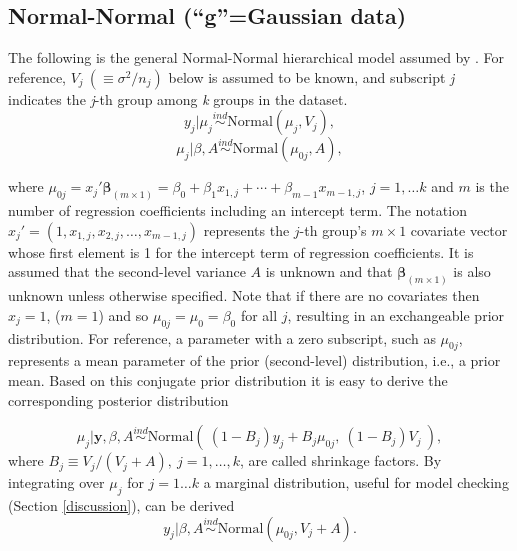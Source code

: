 \documentclass[article]{jss}
\begin{document}
\subsection[Normal-Normal]{Normal-Normal (``g''=Gaussian data)}
The following is the general Normal-Normal hierarchical model assumed by . For reference,  $V_{j}~(\equiv \sigma^{2}/n_{j})$ below is assumed to be known, and subscript \emph{j} indicates the \emph{j}-th group among \emph{k} groups in the dataset.
\begin{equation}\label{normalobs}
y_{j}\vert \mu_{j} \stackrel{ind}{\sim}\textrm{Normal}(\mu_{j}, V_{j}),
\end{equation}
\begin{equation}\label{normalprior}
\mu_{j}\vert \beta, A\stackrel{ind}{\sim}\textrm{Normal}(\mu_{0j}, A),
\end{equation}

where $\mu_{0j} = x_{j}' \mathbf{\beta}_{(m\times1)}=\beta_{0}+\beta_{1}x_{1, j} + \cdots + \beta_{m-1}x_{m-1, j}$, $j=1, \ldots k$ and $m$ is the number of regression coefficients including an intercept term. The notation $x_{j}'=(1, x_{1, j}, x_{2, j}, \ldots, x_{m-1, j})$ represents the $j$-th group's $m\times 1$ covariate vector whose first element is 1 for the intercept term of regression coefficients. It is assumed that the second-level variance $A$ is unknown and that $\mathbf{\beta}_{(m\times1)}$ is also unknown unless otherwise specified. Note that if there are no covariates then $x_{j}=1$, ($m=1$) and so $\mu_{0j}=\mu_{0}=\beta_{0}$ for all $j$, resulting in an exchangeable prior distribution. For reference, a parameter with a zero subscript, such as $\mu_{0j}$, represents a mean parameter of the prior (second-level) distribution, i.e., a prior mean. Based on this conjugate prior distribution it is easy to derive the corresponding posterior distribution



\begin{equation} \label{normalpost}
\mu_{j}\vert \textbf{y}, \beta, A \stackrel{ind}{\sim}\textrm{Normal}(~(1-B_{j})y_{j} + B_{j}\mu_{0j},~(1-B_{j})V_{j}~),
\end{equation}
where $B_{j}\equiv V_{j}/(V_{j} + A),~j=1, \ldots, k$, are called shrinkage factors. By integrating over $\mu_{j}$ for $j = 1 \ldots k$ a marginal distribution, useful for model checking (Section \ref{discussion}), can be derived
\begin{equation} \label{normalmarginal}
y_{j}\vert \beta, A \stackrel{ind}{\sim}\textrm{Normal}(\mu_{0j}, V_{j} + A). 
\end{equation}
\end{document}
